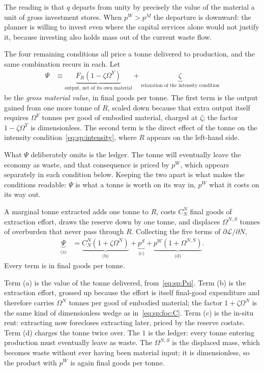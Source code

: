 The reading is that $q$ departs from unity by precisely the value of the material a unit of gross investment stores. When $p^W>p^M$ the departure is downward: the planner is willing to invest even where the capital services alone would not justify it, because investing also holds mass out of the current waste flow.

 The four remaining conditions all price a tonne delivered to production, and the same combination recurs in each. Let
\begin{align}
\Psi &\equiv \underbrace{F_R\left(1-\zeta\Omega^Y\right)}_{\text{output, net of its own material}}+\underbrace{\zeta}_{\text{relaxation of the intensity condition}}
\label{eq:sp:Psi}
\end{align}
be the \emph{gross material value}, in final goods per tonne. The first term is the output gained from one more tonne of $R$, scaled down because that extra output itself requires $\Omega^Y$ tonnes per good of embodied material, charged at $\zeta$; the factor $1-\zeta\Omega^Y$ is dimensionless. The second term is the direct effect of the tonne on the intensity condition~\eqref{eq:sp:intensity}, where $R$ appears on the left-hand side.

What $\Psi$ deliberately omits is the ledger. The tonne will eventually leave the economy as waste, and that consequence is priced by $p^W$, which appears separately in each condition below. Keeping the two apart is what makes the conditions readable: $\Psi$ is what a tonne is worth on its way in, $p^W$ what it costs on its way out.

 A marginal tonne extracted adds one tonne to $R$, costs $C^N_N$ final goods of extraction effort, draws the reserve down by one tonne, and displaces $\Omega^{N,S}$ tonnes of overburden that never pass through $R$. Collecting the five terms of $\partial\mathcal L/\partial N$,
\begin{align}
\underbrace{\Psi}_{\text{(a)}} &= \underbrace{C^N_N\left(1+\zeta\Omega^N\right)}_{\text{(b)}}
+\underbrace{p^S}_{\text{(c)}}
+\underbrace{p^W\left(1+\Omega^{N,S}\right)}_{\text{(d)}} .
\label{eq:sp:foc:N}
\end{align}
Every term is in final goods per tonne.

Term (a) is the value of the tonne delivered, from~\eqref{eq:sp:Psi}. Term (b) is the extraction effort, grossed up because the effort is itself final-good expenditure and therefore carries $\Omega^N$ tonnes per good of embodied material; the factor $1+\zeta\Omega^N$ is the same kind of dimensionless wedge as in~\eqref{eq:sp:foc:C}. Term (c) is the in-situ rent: extracting now forecloses extracting later, priced by the reserve costate. Term (d) charges the tonne twice over. The $1$ is the ledger: every tonne entering production must eventually leave as waste. The $\Omega^{N,S}$ is the displaced mass, which becomes waste without ever having been material input; it is dimensionless, so the product with $p^W$ is again final goods per tonne.

